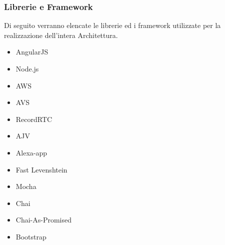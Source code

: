 \documentclass[../ManualeSviluppatore_v1.0.0.tex]{subfiles}
\begin{document}
		\subsubsection{Librerie e Framework}
			Di seguito verranno elencate le librerie ed i framework utilizzate per la realizzazione dell'intera Architettura.
			\begin{itemize}
				\item AngularJS
				\item Node.js
				\item AWS
				\item AVS
				\item RecordRTC
				\item AJV
				\item Alexa-app
				\item Fast Levenshtein
				\item Mocha
				\item Chai
				\item Chai-As-Promised
				\item Bootstrap
			\end{itemize}
\end{document}
